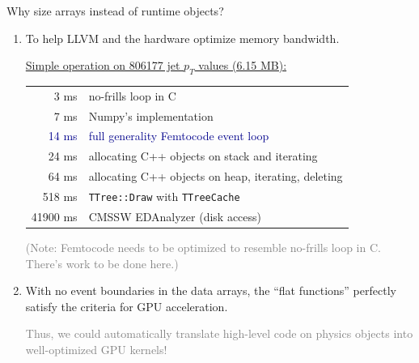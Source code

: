 \documentclass{beamer}
\begin{document}
\begin{frame}{Why size arrays instead of runtime objects?}
\vspace{0.4 cm}
\begin{enumerate}\setlength{\itemsep}{0.2 cm}
\item To help LLVM and the hardware optimize memory bandwidth.

\vspace{0.2 cm}
\underline{Simple operation on 806177 jet $p_T$ values (6.15 MB):}

\vspace{-0.4 cm}
\begin{center}
\begin{tabular}{r l}
3 ms & no-frills loop in C \\
7 ms & Numpy's implementation \\
\textcolor{darkblue}{14 ms} & \textcolor{darkblue}{full generality Femtocode event loop} \\
24 ms & allocating C++ objects on stack and iterating \\
64 ms & allocating C++ objects on heap, iterating, deleting \\
518 ms & {\tt TTree::Draw} with {\tt TTreeCache} \\
41900 ms & CMSSW EDAnalyzer (disk access)
\end{tabular}
\end{center}

\textcolor{gray}{(Note: Femtocode needs to be optimized to resemble no-frills loop in C. There's work to be done here.)}

\item<2-> With no event boundaries in the data arrays, the ``flat functions'' perfectly satisfy the criteria for GPU acceleration.

\vspace{0.1 cm}
\textcolor{gray}{Thus, we could automatically translate high-level code on physics objects into well-optimized GPU kernels!}
\end{enumerate}
\end{frame}






\end{document}
